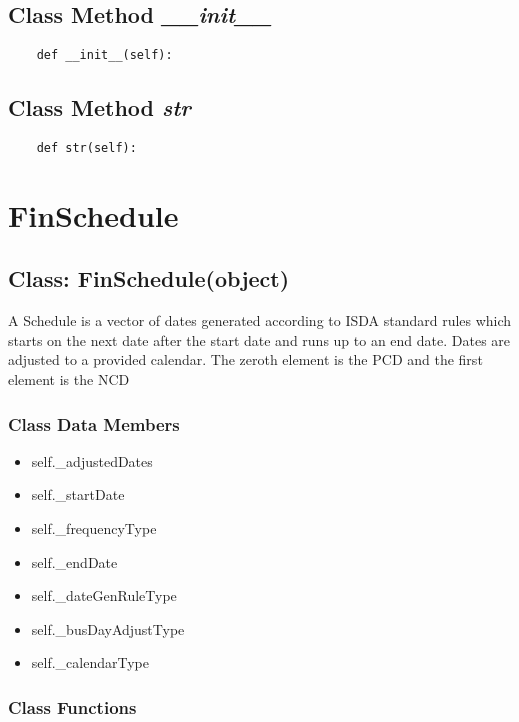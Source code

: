 \documentclass[twoside,11pt]{book}
\begin{document}
\subsection{Class Method {\it \_\_init\_\_}}


\begin{lstlisting}
    def __init__(self):
\end{lstlisting}

\subsection{Class Method {\it str}}


\begin{lstlisting}
    def str(self):
\end{lstlisting}

\newpage
\section{FinSchedule}

\subsection{Class: FinSchedule(object)}
A Schedule is a vector of dates generated according to ISDA standard rules which starts on the next date after the start date and runs up to an end date. Dates are adjusted to a provided calendar. The zeroth element is the PCD and the first element is the NCD 

\subsubsection{Class Data Members}
\begin{itemize}
\item{self.\_adjustedDates}
\item{self.\_startDate}
\item{self.\_frequencyType}
\item{self.\_endDate}
\item{self.\_dateGenRuleType}
\item{self.\_busDayAdjustType}
\item{self.\_calendarType}
\end{itemize}

\subsubsection{Class Functions}
\end{document}
